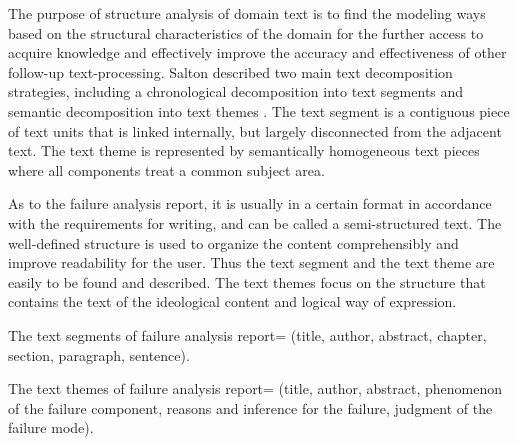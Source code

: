\documentclass{elsarticle}
\begin{document}
The purpose of structure analysis of domain text is to find the
modeling ways based on the structural characteristics of the domain
for the further access to acquire knowledge and effectively improve
the accuracy and effectiveness of other follow-up
text-processing. Salton described two main text decomposition
strategies, including a chronological decomposition into text segments
and semantic decomposition into text themes \cite{234834}. The text segment is
a contiguous piece of text units that is linked internally, but
largely disconnected from the adjacent text. The text theme is
represented by semantically homogeneous text pieces where all
components treat a common subject area.

As to the failure analysis report, it is usually in a certain format
in accordance with the requirements for writing, and can be called a
semi-structured text. The well-defined structure is used to organize
the content comprehensibly and improve readability for the user. Thus
the text segment and the text theme are easily to be found and
described. The text themes focus on the structure that contains the
text of the ideological content and logical way of expression.

\begin{itshape}
  The text segments of failure analysis report= (title, author,
  abstract, chapter, section, paragraph, sentence). 

The text themes of failure analysis report= (title, author, abstract, phenomenon of the failure component, reasons and inference for the failure, judgment of the failure mode).

\end{itshape}
\end{document}
